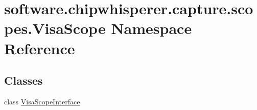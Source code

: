 \hypertarget{namespacesoftware_1_1chipwhisperer_1_1capture_1_1scopes_1_1VisaScope}{}\section{software.\+chipwhisperer.\+capture.\+scopes.\+Visa\+Scope Namespace Reference}
\label{namespacesoftware_1_1chipwhisperer_1_1capture_1_1scopes_1_1VisaScope}
\subsection*{Classes}
\begin{DoxyCompactItemize}
\item 
class \hyperlink{classsoftware_1_1chipwhisperer_1_1capture_1_1scopes_1_1VisaScope_1_1VisaScopeInterface}{Visa\+Scope\+Interface}
\end{DoxyCompactItemize}
